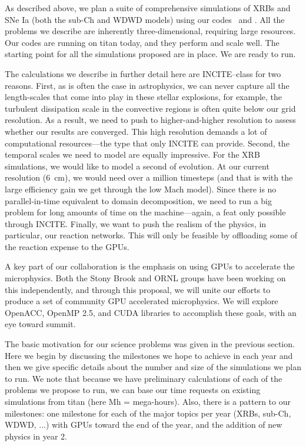 As described above, we plan a suite of comprehensive simulations of
XRBs and SNe Ia (both the sub-Ch and WDWD models) using our
codes \maestro\ and \castro.  All the problems we
describe are inherently three-dimensional, requiring large resources.
Our codes are running on titan today, and they perform and scale
well.  The starting point for all the simulations proposed are in
place.  We are ready to run.

The calculations we describe in further detail here are INCITE--class 
for two reasons.  First, as is often the case in astrophysics, we can
never capture all the length-scales that come into play in these
stellar explosions, for example, the turbulent dissipation scale in
the convective regions is often quite below our grid resolution.  As a
result, we need to push to higher-and-higher resolution to assess
whether our results are converged.  This high resolution demands a lot
of computational resources---the type that only INCITE can provide.
Second, the temporal scales we need to model are equally impressive.
For the XRB simulations, we would like to model a second of evolution.
At our current resolution (6~cm), we would need over a million
timesteps (and that is with the large efficiency gain we get through
the low Mach model).  Since there is no parallel-in-time equivalent to
domain decomposition, we need to run a big problem for long amounts of
time on the machine---again, a feat only possible through INCITE.
Finally, we want to push the realism of the physics, in particular,
our reaction networks.  This will only be feasible by offloading some
of the reaction expense to the GPUs.

A key part of our collaboration is the emphasis on using GPUs
to accelerate the microphysics.  Both the Stony Brook and ORNL
groups have been working on this independently, and through this
proposal, we will unite our efforts to produce a set of community
GPU accelerated microphysics.  We will explore OpenACC, OpenMP 2.5,
and CUDA libraries to accomplish these goals, with an eye toward
summit.


The basic motivation for our science problems was given in the
previous section.  Here we begin by discussing the milestones we hope
to achieve in each year and then we give specific details about the
number and size of the simulations we plan to run.  We note that because
we have preliminary calculations of each of the problems we propose to
run, we can base our time requests on existing simulations from titan
(here Mh = mega-hours).  Also, there is a pattern to our milestones:
one milestone for each of the major topics per year (XRBs, sub-Ch,
WDWD, ...) with GPUs toward the end of the year, and the addition of 
new physics in year 2.  

